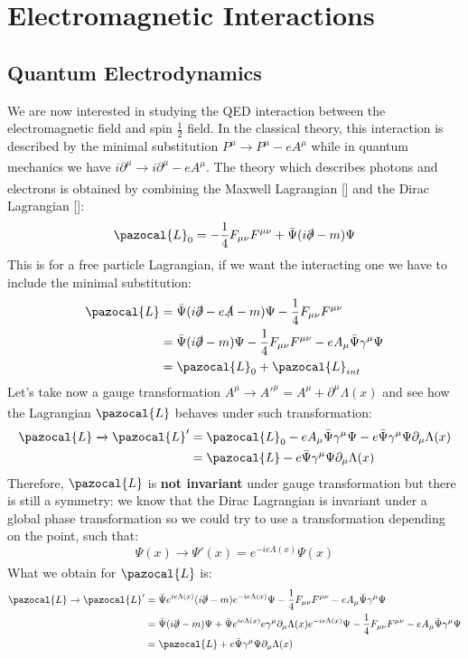 \documentclass[../main.tex]{subfiles}
\begin{document}
\setchapterpreamble[u]{\margintoc}
\chapter[Electromagnetic Interactions]{Electromagnetic Interactions\footnotemark[0]}
\section{Quantum Electrodynamics}
We are now interested in studying the QED interaction between the electromagnetic field and spin $\frac{1}{2}$ field. In the classical theory, this interaction is described by the minimal substitution $P^\mu\xrightarrow[]{}P^\mu-eA^\mu$ while in quantum mechanics we have $i\partial^\mu\xrightarrow[]{}i\partial^\mu-eA^\mu$. The theory which describes photons and electrons is obtained by combining the Maxwell Lagrangian [] and the Dirac Lagrangian []:
\[
\pazocal{L}_0=-\frac{1}{4}F_{\mu\nu}F^{\mu\nu}+\bar{\Psi}(i\slashed{\partial}-m)\Psi
\]
This is for a free particle Lagrangian, if we want the interacting one we have to include the minimal substitution:
\begin{align*}
\pazocal{L}&=\bar{\Psi}(i\slashed{\partial}-e\slashed{A}-m)\Psi-\frac{1}{4}F_{\mu\nu}F^{\mu\nu}\\
&=\bar{\Psi}(i\slashed{\partial}-m)\Psi-\frac{1}{4}F_{\mu\nu}F^{\mu\nu}-eA_\mu\bar{\Psi}\gamma^\mu\Psi\\
&=\pazocal{L}_0+\pazocal{L}_{int}
\end{align*}
Let's take now a gauge transformation $A^\mu\xrightarrow[]{}A'^\mu=A^\mu+\partial^\mu\Lambda(x)$ and see how the Lagrangian $\pazocal{L}$ behaves under such transformation:
\begin{align*}
\pazocal{L}\xrightarrow[]{}\pazocal{L}'&=\pazocal{L}_0-eA_\mu\bar{\Psi}\gamma^\mu\Psi-e\bar{\Psi}\gamma^\mu\Psi\partial_\mu\Lambda(x)\\
&=\pazocal{L}-e\bar{\Psi}\gamma^\mu\Psi\partial_\mu\Lambda(x)
\end{align*}
Therefore, $\pazocal{L}$ is \textbf{not invariant} under gauge transformation but there is still a symmetry: we know that the Dirac Lagrangian is invariant under a global phase transformation so we could try to use a transformation depending on the point, such that:
\[
\Psi(x)\xrightarrow[]{}\Psi'(x)=e^{-ie\Lambda(x)}\Psi(x)
\]
What we obtain for $\pazocal{L}$ is:
\begin{align*}
\pazocal{L}\xrightarrow[]{}\pazocal{L}'&=\bar{\Psi}e^{ie\Lambda(x)}(i\slashed{\partial}-m)e^{-ie\Lambda(x)}\Psi-\frac{1}{4}F_{\mu\nu}F^{\mu\nu}-eA_\mu\bar{\Psi}\gamma^\mu\Psi\\
&=\bar{\Psi}(i\slashed{\partial}-m)\Psi+\bar{\Psi}e^{ie\Lambda(x)}e\gamma^\mu\partial_\mu\Lambda(x)e^{-ie\Lambda(x)}\Psi-\frac{1}{4}F_{\mu\nu}F^{\mu\nu}-eA_\mu\bar{\Psi}\gamma^\mu\Psi\\
&=\pazocal{L}+e\bar{\Psi}\gamma^\mu\Psi\partial_\mu\Lambda(x)
\end{align*}
\end{document}
